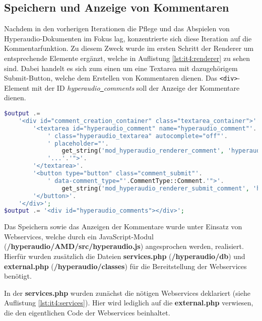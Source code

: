\subsection{Speichern und Anzeige von Kommentaren}
\label{sub:SpeichernKommentare}
Nachdem in den vorherigen Iterationen die Pflege und das Abspielen von Hyperaudio-Dokumenten im Fokus lag, konzentrierte sich diese Iteration auf die Kommentarfunktion. Zu diesem Zweck wurde im ersten Schritt der Renderer um entsprechende Elemente ergänzt, welche in Auflistung \ref{lst:it4:renderer} zu sehen sind. Dabei handelt es sich zum einen um eine Textarea mit dazugehörigem Submit-Button, welche dem Erstellen von Kommentaren dienen. Das \texttt{<div>}-Element mit der ID \mbox{\textit{hyperaudio\underline{{ }}comments}} soll der Anzeige der Kommentare dienen.

\begin{lstlisting}[language=php,
             linewidth=\textwidth,
             caption={Ausschnitt der \textbf{renderer.php} in der 4. Iteration},
             label={lst:it4:renderer}]
$output .=
    '<div id="comment_creation_container" class="textarea_container">'.
        '<textarea id="hyperaudio_comment" name="hyperaudio_comment"'.
            ' class="hyperaudio_textarea" autocomplete="off"'.
            ' placeholder="'.
                get_string('mod_hyperaudio_renderer_comment', 'hyperaudio').
            '...'.'">'.
        '</textarea>'.
        '<button type="button" class="comment_submit"'.
            ' data-comment_type="'.CommentType::Comment.'">'.
                get_string('mod_hyperaudio_renderer_submit_comment', 'hyperaudio').
        '</button>'.
    '</div>';
$output .= '<div id="hyperaudio_comments"></div>';
\end{lstlisting}

Das Speichern sowie das Anzeigen der Kommentare wurde unter Einsatz von Webservices, welche durch ein JavaScript-Modul (\textbf{/hyperaudio/AMD/src/hyperaudio.js}) angesprochen werden, realisiert. Hierfür wurden zusätzlich die Dateien \textbf{services.php} (\textbf{/hyperaudio/db}) und \textbf{external.php} (\textbf{/hyperaudio/classes}) für die Bereitstellung der Webservices benötigt.

In der \textbf{services.php} wurden zunächst die nötigen Webservices deklariert (siehe Auflistung \ref{lst:it4:services}). Hier wird lediglich auf die \textbf{external.php} verwiesen, die den eigentlichen Code der Webservices beinhaltet.

